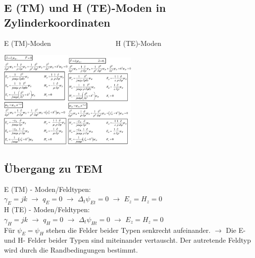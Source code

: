 \documentclass[english]{latex4ei/latex4ei_sheet}
\begin{document}
\begin{sectionbox}
    \subsection{E (TM) und H (TE)-Moden in Zylinderkoordinaten}
    E (TM)-Moden$\quad\quad\quad\quad\quad\quad\quad\quad\quad$ H (TE)-Moden
    \begin{center}\includegraphics[width = 3.4cm]{./img/TM-zylinder.png}\includegraphics[width = 3.4cm]{./img/TE-zylinder.png}\end{center}
\end{sectionbox}


\begin{sectionbox}
    \subsection{Übergang zu TEM}
    E (TM) - Moden/Feldtypen:\\
    $\gamma_E = jk$ $\rightarrow$ $q_E = 0$ $\rightarrow$ $\Delta_t\psi_{Et} = 0$ $\rightarrow$ $E_z = H_z = 0$\\

    H (TE) - Moden/Feldtypen:\\
    $\gamma_H = jk$ $\rightarrow$ $q_H = 0$ $\rightarrow$ $\Delta_t\psi_{Ht} = 0$ $\rightarrow$ $E_z = H_z = 0$\\

    Für $\psi_{E} = \psi_{H}$ stehen die Felder beider Typen senkrecht aufeinander. $\rightarrow$ Die E- und H- Felder beider Typen sind miteinander vertauscht. Der autretende Feldtyp wird durch die Randbedingungen bestimmt.
\end{sectionbox}
\end{document}
